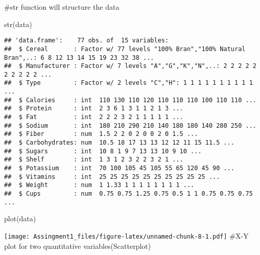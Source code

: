 \documentclass[]{article}
\newenvironment{Shaded}{\begin{snugshade}}{\end{snugshade}}
\newcommand{\AttributeTok}[1]{\textcolor[rgb]{0.77,0.63,0.00}{#1}}
\newcommand{\DecValTok}[1]{\textcolor[rgb]{0.00,0.00,0.81}{#1}}
\newcommand{\FunctionTok}[1]{\textcolor[rgb]{0.00,0.00,0.00}{#1}}
\newcommand{\NormalTok}[1]{#1}
\newcommand{\SpecialCharTok}[1]{\textcolor[rgb]{0.00,0.00,0.00}{#1}}
\newcommand{\StringTok}[1]{\textcolor[rgb]{0.31,0.60,0.02}{#1}}
\begin{document}
\#str function will structure the data

\begin{Shaded}
\begin{Highlighting}[]
\FunctionTok{str}\NormalTok{(data)}
\end{Highlighting}
\end{Shaded}

\begin{verbatim}
## 'data.frame':    77 obs. of  15 variables:
##  $ Cereal       : Factor w/ 77 levels "100% Bran","100% Natural Bran",..: 6 8 12 13 14 15 19 23 32 38 ...
##  $ Manufacturer : Factor w/ 7 levels "A","G","K","N",..: 2 2 2 2 2 2 2 2 2 2 ...
##  $ Type         : Factor w/ 2 levels "C","H": 1 1 1 1 1 1 1 1 1 1 ...
##  $ Calories     : int  110 130 110 120 110 110 110 100 110 110 ...
##  $ Protein      : int  2 3 6 1 3 1 1 2 1 3 ...
##  $ Fat          : int  2 2 2 3 2 1 1 1 1 1 ...
##  $ Sodium       : int  180 210 290 210 140 180 180 140 280 250 ...
##  $ Fiber        : num  1.5 2 2 0 2 0 0 2 0 1.5 ...
##  $ Carbohydrates: num  10.5 18 17 13 13 12 12 11 15 11.5 ...
##  $ Sugars       : int  10 8 1 9 7 13 13 10 9 10 ...
##  $ Shelf        : int  1 3 1 2 3 2 2 3 2 1 ...
##  $ Potassium    : int  70 100 105 45 105 55 65 120 45 90 ...
##  $ Vitamins     : int  25 25 25 25 25 25 25 25 25 25 ...
##  $ Weight       : num  1 1.33 1 1 1 1 1 1 1 1 ...
##  $ Cups         : num  0.75 0.75 1.25 0.75 0.5 1 1 0.75 0.75 0.75 ...
\end{verbatim}

\begin{Shaded}
\begin{Highlighting}[]
\FunctionTok{plot}\NormalTok{(data)}
\end{Highlighting}
\end{Shaded}

\texttt{[image: Assingment1\_files/figure-latex/unnamed-chunk-8-1.pdf]}
\#X-Y plot for two quantitative variables(Scatterplot)

\begin{Shaded}
\end{Shaded}
\end{document}
